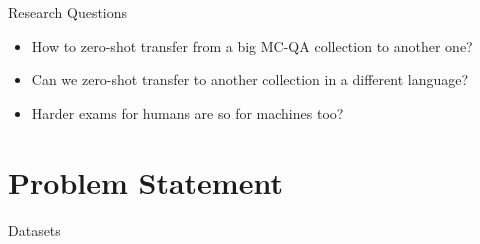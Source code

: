 \documentclass[]{beamer}
\def\mAlertSpace{\vspace{0.5em}}
\begin{document}

  \begin{frame}{\secname}
    \begin{alertblock}{Research Questions}
      \begin{itemize}
        \item How to zero-shot transfer from a big MC-QA collection to another one?
        \item Can we zero-shot transfer to another collection in a different language?
        \item Harder exams for humans are so for machines too?
      \end{itemize}
    \end{alertblock}
  \end{frame}

\section{Problem Statement}
  \begin{frame}{\secname}
    \begin{alertblock}{Datasets}
      \mAlertSpace
      
    \end{alertblock}
  \end{frame}
\end{document}
